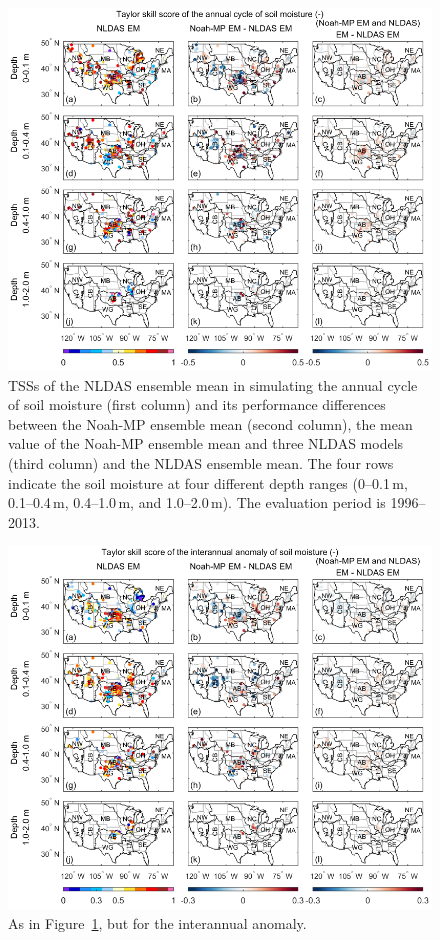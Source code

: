\documentclass[essd, manuscript]{copernicus}
\begin{document}
\begin{figure}[t]
  \includegraphics[width=12cm]{fig/fig05.pdf}
  \caption{TSSs of the NLDAS ensemble mean in simulating the annual cycle of soil moisture (first column) and its performance differences between the Noah-MP ensemble mean (second column), the mean value of the Noah-MP ensemble mean and three NLDAS models (third column) and the NLDAS ensemble mean. The four rows indicate the soil moisture at four different depth ranges (0--0.1\,m, 0.1--0.4\,m, 0.4--1.0\,m, and 1.0--2.0\,m). The evaluation period is 1996--2013.}
  \label{fig:sm:ancy:tss}
\end{figure}

\begin{figure}[t]
  \includegraphics[width=12cm]{fig/fig06.pdf}
  \caption{As in Figure~\ref{fig:sm:ancy:tss}, but for the interannual anomaly.}
  \label{fig:sm:anom:tss}
\end{figure}
\end{document}
